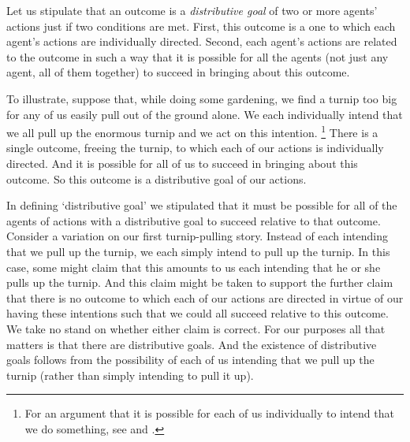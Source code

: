 \documentclass[14pt,a4paper]{extarticle}
\begin{document}
Let us stipulate that an outcome is a \emph{distributive goal} of two or more agents' actions just if two conditions are met.
First, this outcome is a one to which each agent's actions are individually directed.
Second, each agent's actions are related to the outcome in such a way that it is possible for all the agents (not just any agent, all of them together) to succeed in bringing about this outcome.

To illustrate,
suppose that, while doing some gardening,
we find a turnip too big for any of us easily pull out of the ground alone.
We each individually intend that we all pull up the enormous turnip
and we act on this intention.%
\footnote{
For an argument that it is possible for each of us individually to intend that we do something, see \citet{Bratman:1999fr} and \citet[Chapter 2]{Bratman:2012fk}.
}
There is a single outcome,
freeing the turnip,
to which each of our actions is individually directed.
And it is possible for all of us to succeed in bringing about this outcome.
So this outcome is a distributive goal of our actions.


In defining `distributive goal' we stipulated that it must be possible for all of the agents of actions with a distributive goal to succeed relative to that outcome.
Consider a variation on our first turnip-pulling story.
Instead of each intending that we pull up the turnip,
we each simply intend  to pull up the turnip.
In this case,
some might claim that
this amounts to us each intending that he or she pulls up the turnip.
And this claim might be taken to support the further claim that
there is no outcome to which each of our actions are directed
in virtue of our having these intentions
such that we could all succeed relative to this outcome.
We take no stand on whether either claim is correct.
For our purposes all that matters is that there are distributive goals.
And the existence of distributive goals follows from the possibility of each of us 
intending that we pull up the turnip
(rather than simply
intending to pull it up).
\end{document}
